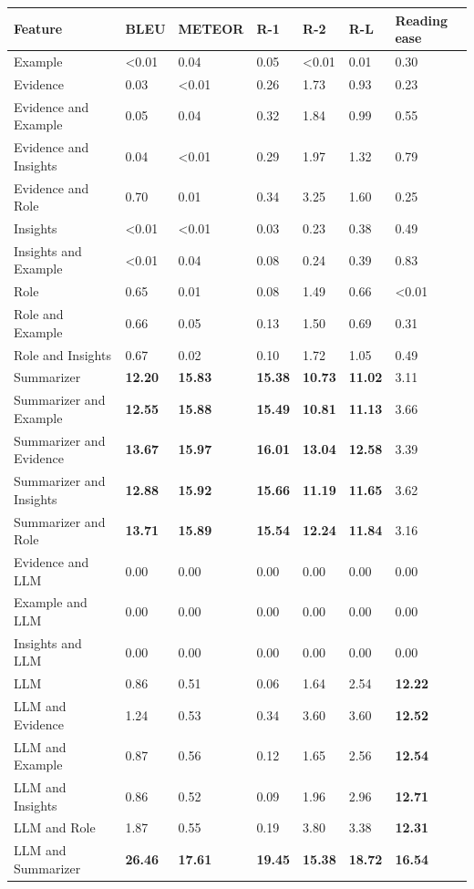 \begin{tabular}{|l|l|l|l|l|l|l|}
\hline
\textbf{Feature} & BLEU & METEOR & R-1 & R-2 & R-L & Reading ease \\
 \hline
 Example & \textless{}0.01 & 0.04 & 0.05 & \textless{}0.01 & 0.01 & 0.30 \\
 \hline
 Evidence & 0.03 & \textless{}0.01 & 0.26 & 1.73 & 0.93 & 0.23 \\
 \hline
 Evidence and Example & 0.05 & 0.04 & 0.32 & 1.84 & 0.99 & 0.55 \\
 \hline
 Evidence and Insights & 0.04 & \textless{}0.01 & 0.29 & 1.97 & 1.32 & 0.79 \\
 \hline
 Evidence and Role & 0.70 & 0.01 & 0.34 & 3.25 & 1.60 & 0.25 \\
 \hline
 Insights & \textless{}0.01 & \textless{}0.01 & 0.03 & 0.23 & 0.38 & 0.49 \\
 \hline
 Insights and Example & \textless{}0.01 & 0.04 & 0.08 & 0.24 & 0.39 & 0.83 \\
 \hline
 Role & 0.65 & 0.01 & 0.08 & 1.49 & 0.66 & \textless{}0.01 \\
 \hline
 Role and Example & 0.66 & 0.05 & 0.13 & 1.50 & 0.69 & 0.31 \\
 \hline
 Role and Insights & 0.67 & 0.02 & 0.10 & 1.72 & 1.05 & 0.49 \\
 \hline
 Summarizer & \textbf{12.20} & \textbf{15.83} & \textbf{15.38} & \textbf{10.73} & \textbf{11.02} & 3.11 \\
 \hline
 Summarizer and Example & \textbf{12.55} & \textbf{15.88} & \textbf{15.49} & \textbf{10.81} & \textbf{11.13} & 3.66 \\
 \hline
 Summarizer and Evidence & \textbf{13.67} & \textbf{15.97} & \textbf{16.01} & \textbf{13.04} & \textbf{12.58} & 3.39 \\
 \hline
 Summarizer and Insights & \textbf{12.88} & \textbf{15.92} & \textbf{15.66} & \textbf{11.19} & \textbf{11.65} & 3.62 \\
 \hline
 Summarizer and Role & \textbf{13.71} & \textbf{15.89} & \textbf{15.54} & \textbf{12.24} & \textbf{11.84} & 3.16 \\
 \hline
 Evidence and LLM & 0.00 & 0.00 & 0.00 & 0.00 & 0.00 & 0.00 \\
 \hline
 Example and LLM & 0.00 & 0.00 & 0.00 & 0.00 & 0.00 & 0.00 \\
 \hline
 Insights and LLM & 0.00 & 0.00 & 0.00 & 0.00 & 0.00 & 0.00 \\
 \hline
 LLM & 0.86 & 0.51 & 0.06 & 1.64 & 2.54 & \textbf{12.22} \\
 \hline
 LLM and Evidence & 1.24 & 0.53 & 0.34 & 3.60 & 3.60 & \textbf{12.52} \\
 \hline
 LLM and Example & 0.87 & 0.56 & 0.12 & 1.65 & 2.56 & \textbf{12.54} \\
 \hline
 LLM and Insights & 0.86 & 0.52 & 0.09 & 1.96 & 2.96 & \textbf{12.71} \\
 \hline
 LLM and Role & 1.87 & 0.55 & 0.19 & 3.80 & 3.38 & \textbf{12.31} \\
 \hline
 LLM and Summarizer & \textbf{26.46} & \textbf{17.61} & \textbf{19.45} & \textbf{15.38} & \textbf{18.72} & \textbf{16.54} \\
\hline
\end{tabular}
